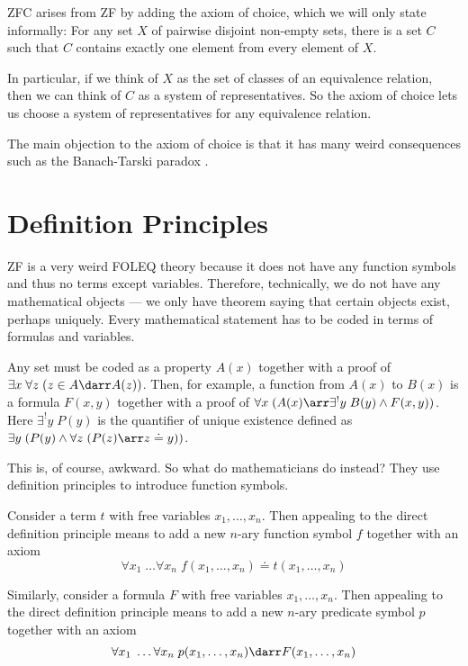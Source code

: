 \begin{definition}
ZFC arises from ZF by adding the axiom of choice, which we will only state informally: For any set $X$ of pairwise disjoint non-empty sets, there is a set $C$ such that $C$ contains exactly one element from every element of $X$.
\end{definition}

In particular, if we think of $X$ as the set of classes of an equivalence relation, then we can think of $C$ as a system of representatives. So the axiom of choice lets us choose a system of representatives for any equivalence relation.

The main objection to the axiom of choice is that it has many weird consequences such as the Banach-Tarski paradox \cite{banach_tarski_paradox}.

\section{Definition Principles}

ZF is a very weird FOLEQ theory because it does not have any function symbols and thus no terms except variables. Therefore, technically, we do not have any mathematical objects --- we only have theorem saying that certain objects exist, perhaps uniquely. Every mathematical statement has to be coded in terms of formulas and variables.

Any set must be coded as a property $A(x)$ together with a proof of $\exists x\;\forall z\;(z\in A\darr A(z))$. Then, for example, a function from $A(x)$ to $B(x)$ is a formula $F(x,y)$ together with a proof of $\forall x\;(A(x)\arr \exists^! y\;B(y)\wedge F(x,y))$. Here $\exists^! y\;P(y)$ is the quantifier of unique existence defined as $\exists y\;(P(y)\wedge \forall z\;(P(z)\arr z\doteq y))$.

This is, of course, awkward. So what do mathematicians do instead? They use definition principles to introduce function symbols.

\begin{definition}\label{def:directdef}
Consider a term $t$ with free variables $x_1,\ldots,x_n$.
Then appealing to the direct definition principle means to add a new $n$-ary function symbol $f$ together with an axiom
\[\forall x_1\;\ldots\forall x_n\;f(x_1,\ldots,x_n)\doteq t(x_1,\ldots,x_n)\]

Similarly, consider a formula $F$ with free variables $x_1,\ldots,x_n$.
Then appealing to the direct definition principle means to add a new $n$-ary predicate symbol $p$ together with an axiom
\[\forall x_1\;\ldots\forall x_n\;p(x_1,\ldots,x_n)\darr F(x_1,\ldots,x_n)\]
\end{definition}

